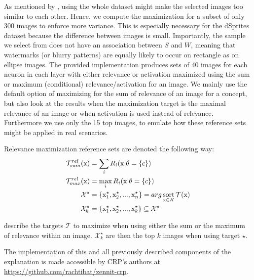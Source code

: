 As mentioned by \citet{Achtibat2022}, using the whole dataset might make the selected images too similar to each other. Hence, we compute the maximization for a subset of only 300 images to enforce more variance. This is especially necessary for the dSprites dataset because the difference between images is small. Importantly, the sample we select from does not have an association between $S$ and $W$, meaning that watermarks (or blurry patterns) are equally likely to occur on rectangle as on ellipse images. 
The provided implementation produces sets of 40 images for each neuron in each layer with either relevance or activation maximized using the sum or maximum (conditional) relevance/activation for an image. We mainly use the default option of maximizing for the sum of relevance of an image for a concept, but also look at the results when the maximization target is the maximal relevance of an image or when activation is used instead of relevance. Furthermore we use only the 15 top images, to emulate how these reference sets might be applied in real scenarios. 

Relevance maximization reference sets are denoted the following way:
 \begin{align}
\mathcal{T}_{sum}^{rel} (\mathrm{x}) & = \sum_{i} R_i(\mathrm{x}|\theta=\{c\}) \label{eq:rel_sum}\\
\mathcal{T}_{max}^{rel} (\mathrm{x}) & = \max_{i} R_i(\mathrm{x}|\theta=\{c\}) \label{eq:rel_max}\\
\mathcal{X}^{\star} & = \{ \mathrm{x}_{1}^{\star},\mathrm{x}_{2}^{\star},..., \mathrm{x}_{n}^{\star} \} = arg \operatorname*{sort}_{\mathrm{x} \in \mathcal{X}} \mathcal{T}(\mathrm{x}) \\
\mathcal{X}_{k}^{\star} & = \{ \mathrm{x}_{1}^{\star},\mathrm{x}_{2}^{\star},..., \mathrm{x}_{k}^{\star} \} \subseteq \mathcal{X}^{\star}
 \end{align}

  describe the targets $\mathcal{T}$ to maximize when using either the sum or the maximum of relevance within an image. $\mathcal{X}_k^\star$ are then the top $k$ images when using target $\star$.

 
The implementation of this and all previously described components of the explanation is made accessible by CRP's authors at
\url{https://github.com/rachtibat/zennit-crp}. 
